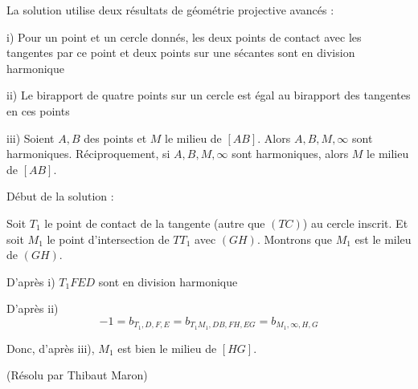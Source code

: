 \begin{sol}[75]
\begin{sol}[99]
\begin{center}
		\end{center}			
		La solution utilise deux résultats de géométrie projective avancés : 
		
		i) Pour un point et un cercle donnés, les deux points de contact avec les tangentes par ce point et deux points sur une sécantes sont en division harmonique
		
		ii) Le birapport de quatre points sur un cercle est égal au birapport des tangentes en ces points
		
		iii) Soient $A,B$ des points et $M$ le milieu de $[AB]$. Alors $A,B,M,\infty$ sont harmoniques. Réciproquement, si $A,B,M,\infty$ sont harmoniques, alors $M$ le milieu de $[AB]$.
		
		Début de la solution :
		
		Soit $T_1$ le point de contact de la tangente (autre que $(TC)$) au cercle inscrit. Et soit $M_1$ le point d'intersection de $TT_1$ avec $(GH)$. Montrons que $M_1$ est le mileu de $(GH)$.
				
		D'après i) $T_1 F E D$ sont en division harmonique
		
		D'après ii) $$-1 =b_{T_1,D,F,E}=b_{T_1M_1,DB,FH,EG}=b_{M_1,\infty,H,G}$$
		
		Donc, d'après iii), $M_1$ est bien le milieu de $[HG]$.
\end{sol}

\begin{sol}[130](Résolu par Thibaut Maron)


\end{sol}
\end{sol}
